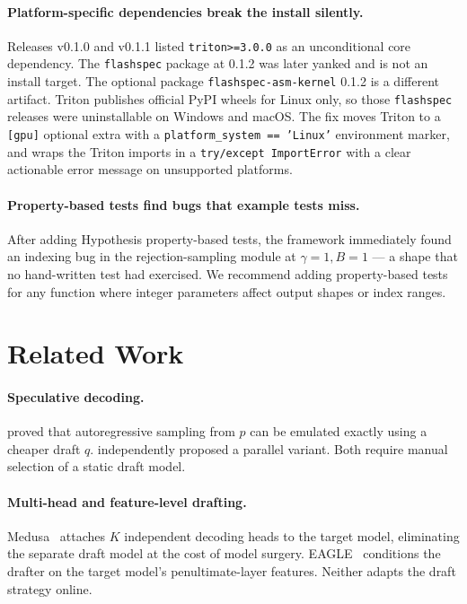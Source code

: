 \documentclass[11pt]{article}
\begin{document}
\paragraph{Platform-specific dependencies break the install silently.}
Releases v0.1.0 and v0.1.1 listed \texttt{triton>=3.0.0} as
an unconditional core dependency.
The \texttt{flashspec} package at 0.1.2 was later yanked and is not an
install target.
The optional package \texttt{flashspec-asm-kernel} 0.1.2 is a different
artifact.
Triton publishes official PyPI wheels for Linux only, so those
\texttt{flashspec} releases were uninstallable on Windows and macOS.
The fix moves Triton to a \texttt{[gpu]} optional extra with a
\texttt{platform\_system == 'Linux'} environment marker, and wraps the
Triton imports in a \texttt{try/except ImportError} with a clear
actionable error message on unsupported platforms.

\paragraph{Property-based tests find bugs that example tests miss.}
After adding Hypothesis property-based tests, the framework immediately
found an indexing bug in the rejection-sampling module at
$\gamma=1, B=1$ --- a shape that no hand-written test had exercised.
We recommend adding property-based tests for any function where integer
parameters affect output shapes or index ranges.

\section{Related Work}
\label{sec:related}

\paragraph{Speculative decoding.}
\citet{leviathan2023fast} proved that autoregressive sampling from $p$ can
be emulated exactly using a cheaper draft $q$.
\citet{chen2023accelerating} independently proposed a parallel variant.
Both require manual selection of a static draft model.

\paragraph{Multi-head and feature-level drafting.}
Medusa~\citep{cai2024medusa} attaches $K$ independent decoding heads to
the target model, eliminating the separate draft model at the cost of
model surgery.
EAGLE~\citep{li2024eagle} conditions the drafter on the target model's
penultimate-layer features.
Neither adapts the draft strategy online.
\end{document}
